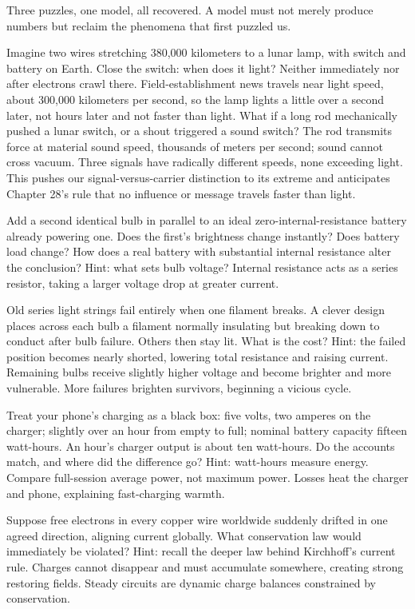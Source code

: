 Three puzzles, one model, all recovered. A model must not merely produce numbers but reclaim the phenomena that first puzzled us.


\begin{thought}
Imagine two wires stretching 380,000 kilometers to a lunar lamp, with switch and battery on Earth. Close the switch: when does it light? Neither immediately nor after electrons crawl there. Field-establishment news travels near light speed, about 300,000 kilometers per second, so the lamp lights a little over a second later, not hours later and not faster than light. What if a long rod mechanically pushed a lunar switch, or a shout triggered a sound switch? The rod transmits force at material sound speed, thousands of meters per second; sound cannot cross vacuum. Three signals have radically different speeds, none exceeding light. This pushes our signal-versus-carrier distinction to its extreme and anticipates Chapter 28's rule that no influence or message travels faster than light.
\end{thought}

\begin{puzzles}
\item Add a second identical bulb in parallel to an ideal zero-internal-resistance battery already powering one. Does the first's brightness change instantly? Does battery load change? How does a real battery with substantial internal resistance alter the conclusion? Hint: what sets bulb voltage? Internal resistance acts as a series resistor, taking a larger voltage drop at greater current.
\item Old series light strings fail entirely when one filament breaks. A clever design places across each bulb a filament normally insulating but breaking down to conduct after bulb failure. Others then stay lit. What is the cost? Hint: the failed position becomes nearly shorted, lowering total resistance and raising current. Remaining bulbs receive slightly higher voltage and become brighter and more vulnerable. More failures brighten survivors, beginning a vicious cycle.
\item Treat your phone's charging as a black box: five volts, two amperes on the charger; slightly over an hour from empty to full; nominal battery capacity fifteen watt-hours. An hour's charger output is about ten watt-hours. Do the accounts match, and where did the difference go? Hint: watt-hours measure energy. Compare full-session average power, not maximum power. Losses heat the charger and phone, explaining fast-charging warmth.
\item Suppose free electrons in every copper wire worldwide suddenly drifted in one agreed direction, aligning current globally. What conservation law would immediately be violated? Hint: recall the deeper law behind Kirchhoff's current rule. Charges cannot disappear and must accumulate somewhere, creating strong restoring fields. Steady circuits are dynamic charge balances constrained by conservation.
\end{puzzles}

